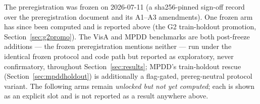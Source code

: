 \documentclass[preprint,11pt]{elsarticle}
\begin{document}
The preregistration was frozen on 2026-07-11 (a sha256-pinned sign-off record over the
preregistration document and its A1--A3 amendments). One frozen arm
has since been computed and is reported above (the G2 train-holdout promotion,
Section~\ref{sec:g2promo}). The VisA and MPDD benchmarks are both post-freeze additions ---
the frozen preregistration mentions neither --- run under the identical frozen protocol and
code path but reported as exploratory, never confirmatory, throughout
Section~\ref{sec:results}; MPDD's train-holdout rescue (Section~\ref{sec:mpddholdout}) is
additionally a flag-gated, prereg-neutral protocol variant. The following arms remain \emph{unlocked but not yet computed}; each is shown as an explicit
slot and is not reported as a result anywhere above.
\end{document}

